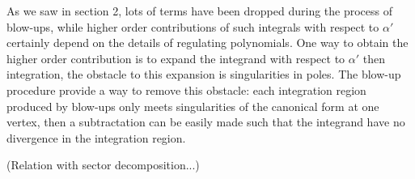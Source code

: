 \documentclass[12pt]{article}
\theoremstyle{definition}
\theoremstyle{plain}
\newtheorem*{pro*}{Proposition}
\begin{document}
As we saw in section 2, lots of terms have been dropped during the process of blow-ups, while higher order contributions of such integrals with respect to $\alpha'$ certainly depend on the details of regulating polynomials. One way to obtain the higher order contribution is to expand the integrand with respect to $\alpha'$ then integration, the obstacle to this expansion is singularities in poles. The blow-up procedure provide a way to remove this obstacle: each integration region produced by blow-ups only meets singularities of the canonical form at one vertex, then a subtractation can be easily made such that the integrand have no divergence in the integration region.

(Relation with sector decomposition...)





	
\end{document}
